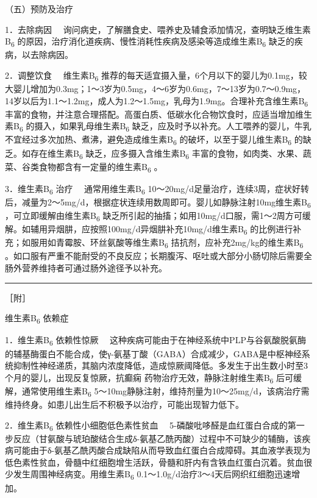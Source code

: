 （五）预防及治疗

{1．去除病因}
　询问病史，了解膳食史、喂养史及辅食添加情况，查明缺乏维生素B\textsubscript{6}
的原因，治疗消化道疾病、慢性消耗性疾病及感染等造成维生素B\textsubscript{6}
缺乏的疾病，以去除病因。

{2．调整饮食} 　维生素B\textsubscript{6}
推荐的每天适宜摄入量，6个月以下的婴儿为0.1mg，较大婴儿增加为0.3mg；1～3岁为0.5mg，4～6岁为0.6mg，7～13岁为0.7～0.9mg，14岁以后为1.1～1.2mg，成人为1.2～1.5mg，乳母为1.9mg。合理补充含维生素B\textsubscript{6}
丰富的食物，并注意合理搭配。高蛋白质、低碳水化合物饮食时，应适当增加维生素B\textsubscript{6}
的摄入，如果乳母维生素B\textsubscript{6}
缺乏，应及时予以补充。人工喂养的婴儿，牛乳不宜经过多次加热、煮沸，避免造成维生素B\textsubscript{6}
的破坏，以至于婴儿维生素B\textsubscript{6}
的缺乏。如存在维生素B\textsubscript{6}
缺乏，应多摄入含维生素B\textsubscript{6}
丰富的食物，如肉类、水果、蔬菜、谷类食物都含有一定量的维生素B\textsubscript{6}
。

{3．维生素B\textsubscript{6} 治疗} 　通常用维生素B\textsubscript{6}
10～20mg/d足量治疗，连续3周，症状好转后，减量为2～5mg/d，根据症状连续用数周即可。婴儿如静脉注射10mg维生素B\textsubscript{6}
，可立即缓解由维生素B\textsubscript{6}
缺乏所引起的抽搐；如用10mg/d口服，需1～2周方可缓解。如辅用异烟肼，应按照100mg/d异烟肼补充10mg/d维生素B\textsubscript{6}
的比例进行补充；如服用如青霉胺、环丝氨酸等维生素B\textsubscript{6}
拮抗剂，应补充2mg/kg的维生素B\textsubscript{6}
。如口服有严重不能耐受的不良反应；长期腹泻、呕吐或大部分小肠切除后需要全肠外营养维持者可通过肠外途径予以补充。

\begin{center}\rule{0.5\linewidth}{\linethickness}\end{center}

［附］

维生素B\textsubscript{6} 依赖症

{1．维生素B\textsubscript{6} 依赖性惊厥}
　这种疾病可能由于在神经系统中PLP与谷氨酸脱氨酶的辅基酶蛋白不能合成，使γ-氨基丁酸（GABA）合成减少，GABA是中枢神经系统抑制性神经递质，其脑内浓度降低，造成惊厥阈降低。多发生于出生数小时至3个月的婴儿，出现反复惊厥，抗癫痫
药物治疗无效，静脉注射维生素B\textsubscript{6}
后可缓解，通常使用维生素B\textsubscript{6}
5～10mg静脉注射，维持剂量为10～25mg/d，该病治疗需维持终身。如患儿出生后不积极予以治疗，可能出现智力低下。

{2．维生素B\textsubscript{6} 依赖性小细胞低色素性贫血}
　5-磷酸吡哆醛是血红蛋白合成的第一步反应（甘氨酸与琥珀酸结合生成δ-氨基乙酰丙酸）过程中不可缺少的辅酶，该疾病可能由于δ-氨基乙酰丙酸合成缺陷从而导致血红蛋白合成障碍。其血液学表现为低色素性贫血，骨髓中红细胞增生活跃，骨髓和肝内有含铁血红蛋白沉着。贫血很少发生周围神经病变。用维生素B\textsubscript{6}
0.1～1.0g/d治疗3～4天后网织红细胞迅速增加。

